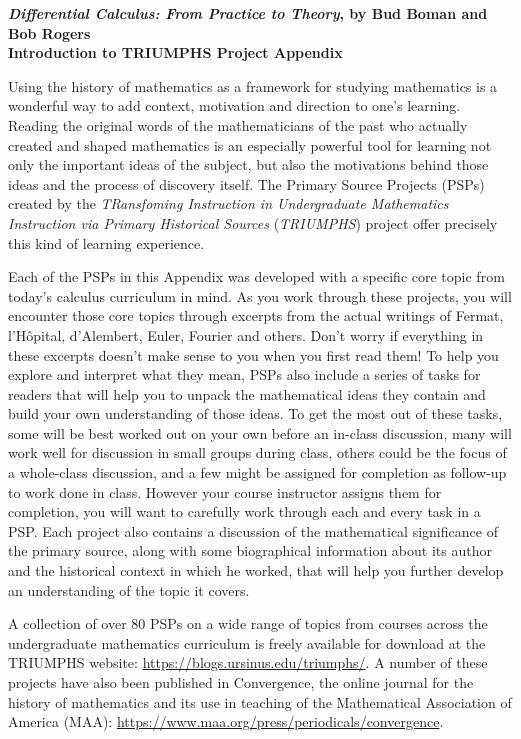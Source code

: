 \documentclass[11pt]{article}
\begin{document}
\noindent\textbf{\emph{Differential Calculus: From Practice to Theory}, by Bud Boman and Bob Rogers\\
Introduction to TRIUMPHS Project Appendix
}

\bigskip

Using the history of mathematics as a framework for studying mathematics is a wonderful way to add context, motivation and direction to one’s learning. Reading the original words of the mathematicians of the past who actually created and shaped mathematics is an especially powerful tool for learning not only the important ideas of the subject, but also the motivations behind those ideas and the process of discovery itself. The Primary Source Projects (PSPs) created by the \emph{TRansfoming Instruction in Undergraduate Mathematics Instruction via Primary Historical Sources} (\emph{TRIUMPHS}) project offer precisely this kind of learning experience.

Each of the PSPs in this Appendix was developed with a specific core topic from today’s calculus curriculum in mind. As you work through these projects, you will encounter those core topics through excerpts from the actual writings of Fermat, l’Hôpital, d’Alembert, Euler, Fourier and others. Don’t worry if everything in these excerpts doesn’t make sense to you when you first read them! To help you explore and interpret what they mean, PSPs also include a series of tasks for readers that will help you to unpack the mathematical ideas they contain and build your own understanding of those ideas. To get the most out of these tasks, some will be best worked out on your own before an in-class discussion, many will work well for discussion in small groups during class, others could be the focus of a whole-class discussion, and a few might be assigned for completion as follow-up to work done in class. However your course instructor assigns them for completion, you will want to carefully work through each and every task in a PSP. Each project also contains a discussion of the mathematical significance of the primary source, along with some biographical information about its author and the historical context in which he worked, that will help you further develop an understanding of the topic it covers.

A collection of over 80 PSPs on a wide range of topics from courses across the undergraduate mathematics curriculum is freely available for download at the TRIUMPHS website: \url{https://blogs.ursinus.edu/triumphs/}.  A number of these projects have also been published in Convergence, the online journal for the history of mathematics and its use in teaching of the Mathematical Association of America (MAA): \url{https://www.maa.org/press/periodicals/convergence}.
\end{document}
